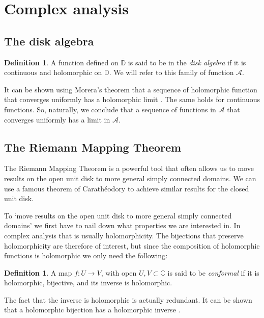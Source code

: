 \documentclass[a4paper,12pt,twoside,BCOR=10mm]{scrbook}
\theoremstyle{definition}
\theoremstyle{definition}
\theoremstyle{definition}
\newtheorem{definition}[theorem]{Definition}
\begin{document}
\section{Complex analysis}
\subsection{The disk algebra}
\begin{definition}
A function defined on $\overline{\mathbb{D}}$ is said to be in the \emph{disk algebra} if it is continuous and holomorphic on $\mathbb{D}$.
We will refer to this family of function $\mathcal{A}$.
\end{definition}
It can be shown using Morera's theorem that a sequence of holomorphic function that converges uniformly has a holomorphic limit \citep{reynir}.
The same holds for continuous functions.
So, naturally, we conclude that a sequence of functions in $\mathcal{A}$ that converges uniformly has a limit in $\mathcal{A}$.
\subsection{The Riemann Mapping Theorem} 
The Riemann Mapping Theorem is a powerful tool that often allows us to move results on the open unit disk to more general simply connected domains.
We can use a famous theorem of Carathéodory to achieve similar results for the closed unit disk.

To `move results on the open unit disk to more general simply connected domains' we first have to nail down what properties we are interested in.
In complex analysis that is usually holomorphicity.
The bijections that preserve holomorphicity are therefore of interest, but since the composition of holomorphic functions is holomorphic we only need the following:
\begin{definition}
A map $f: U \rightarrow V$, with open $U, V \subset \mathbb{C}$ is said to be \emph{conformal} if it is holomorphic, bijective, and its inverse is holomorphic.
\end{definition}
The fact that the inverse is holomorphic is actually redundant.
It can be shown that a holomorphic bijection has a holomorphic inverse \citep{greenkrantz}.
\end{document}
